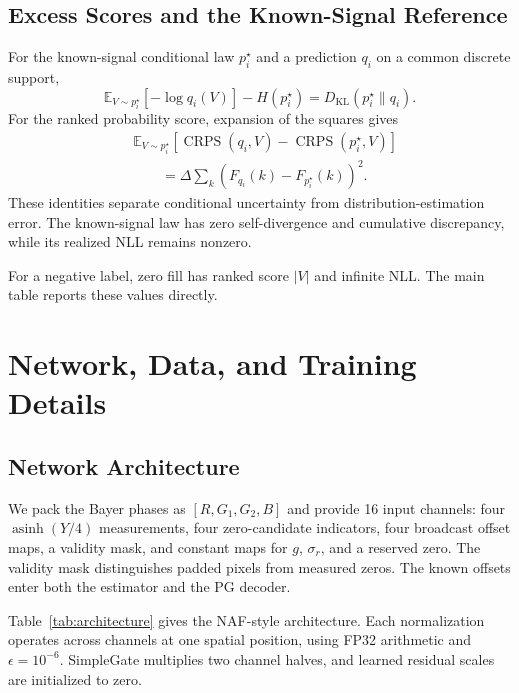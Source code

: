 \documentclass[10pt,twocolumn,journal]{IEEEtran}
\begin{document}
\subsection{Excess Scores and the Known-Signal Reference}
For the known-signal conditional law $p_i^\star$ and a prediction $q_i$ on a common discrete support,
\begin{equation}
\mathbb E_{V\sim p_i^\star}[-\log q_i(V)]-H(p_i^\star)=D_{\mathrm{KL}}(p_i^\star\|q_i).
\end{equation}
For the ranked probability score, expansion of the squares gives
\begin{equation}
\begin{split}
&\mathbb E_{V\sim p_i^\star}[\operatorname{CRPS}(q_i,V)-\operatorname{CRPS}(p_i^\star,V)]\\
&\qquad=\Delta\sum_k\left(F_{q_i}(k)-F_{p_i^\star}(k)\right)^2.
\end{split}
\end{equation}
These identities separate conditional uncertainty from distribution-estimation error. The known-signal law has zero self-divergence and cumulative discrepancy, while its realized NLL remains nonzero.

For a negative label, zero fill has ranked score $|V|$ and infinite NLL. The main table reports these values directly.

\section{Network, Data, and Training Details}
\subsection{Network Architecture}
We pack the Bayer phases as $[R,G_1,G_2,B]$ and provide 16 input channels: four $\operatorname{asinh}(Y/4)$ measurements, four zero-candidate indicators, four broadcast offset maps, a validity mask, and constant maps for $g$, $\sigma_r$, and a reserved zero. The validity mask distinguishes padded pixels from measured zeros. The known offsets enter both the estimator and the PG decoder.

Table~\ref{tab:architecture} gives the NAF-style architecture. Each normalization operates across channels at one spatial position, using FP32 arithmetic and $\epsilon=10^{-6}$. SimpleGate multiplies two channel halves, and learned residual scales are initialized to zero.
\end{document}
